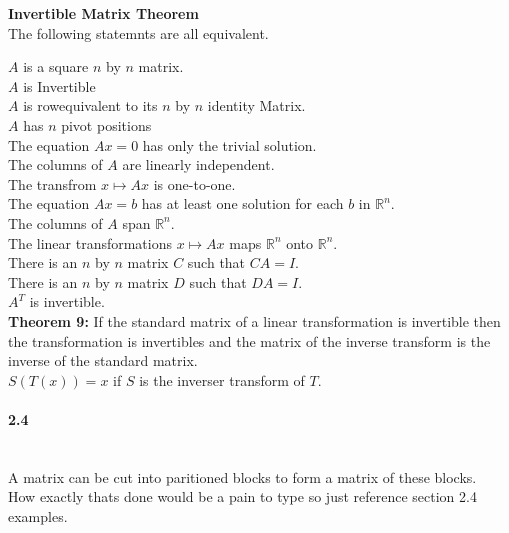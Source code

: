 \documentclass[14pt]{extreport}
\begin{document}
\textbf{Invertible Matrix Theorem}\\

The following statemnts are all equivalent.

$A$ is a square $n$ by $n$ matrix.\\

$A$ is Invertible\\

$A$ is rowequivalent to its $n$ by $n$ identity Matrix.\\

$A$ has $n$ pivot positions\\

The equation $Ax=0$ has only the trivial solution.\\

The columns of $A$ are linearly independent.\\

The transfrom $x \mapsto Ax$ is one-to-one.\\

The equation $Ax=b$ has at least one solution for each $b$ in $\mathbb{R}^n$.\\

The columns of $A$ span $\mathbb{R}^n$.\\

The linear transformations $x \mapsto Ax$ maps $\mathbb{R}^n$ onto $\mathbb{R}^n$.\\

There is an $n$ by $n$ matrix $C$ such that $CA=I$.\\

There is an $n$ by $n$ matrix $D$ such that $DA=I$.\\

$A^T$ is invertible.\\

\textbf{Theorem 9:} If the standard matrix of a linear transformation is invertible then the transformation is invertibles and the matrix of the inverse transform is the inverse of the standard matrix.\\

$S(T(x))=x$ if $S$ is the inverser transform of $T$.\\


\paragraph{2.4}\\

A matrix can be cut into paritioned blocks to form a matrix of these blocks.\\
How exactly thats done would be a pain to type so just reference section 2.4 examples.\\
\end{document}
